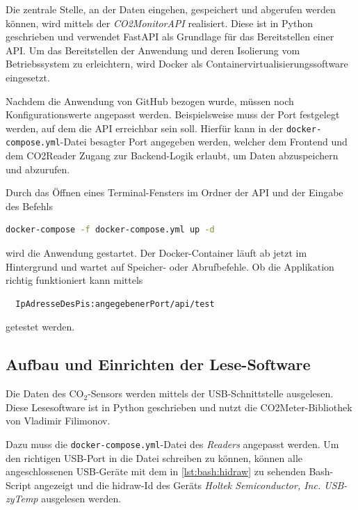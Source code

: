 \documentclass[a4paper,
    11pt,
    headings=small,
    ngerman,
    listof=totoc,
    numbers=noenddot]{scrreprt}[2021/11/13]
\begin{document}
Die zentrale Stelle, an der Daten eingehen, gespeichert und abgerufen werden können, wird mittels der \textit{CO2MonitorAPI} realisiert. Diese ist in Python geschrieben und verwendet FastAPI als Grundlage für das Bereitstellen einer API. Um das Bereitstellen der Anwendung und deren  Isolierung vom Betriebssystem zu erleichtern, wird Docker als Containervirtualisierungssoftware eingesetzt.

Nachdem die Anwendung von GitHub bezogen wurde, müssen noch Konfigurationswerte angepasst werden. Beispielsweise muss der Port festgelegt werden, auf dem die \ac{API} erreichbar sein soll. Hierfür kann in der \texttt{docker-compose.yml}-Datei besagter Port angegeben werden, welcher dem Frontend und dem CO2Reader Zugang zur Backend-Logik erlaubt, um Daten abzuspeichern und abzurufen.

Durch das Öffnen eines Terminal-Fensters im Ordner der \ac{API} und der Eingabe des Befehls

\begin{lstlisting}[language=Bash]
  docker-compose -f docker-compose.yml up -d
\end{lstlisting}

wird die Anwendung gestartet. Der Docker-Container läuft ab jetzt im Hintergrund und wartet auf Speicher- oder Abrufbefehle. Ob die Applikation richtig funktioniert kann mittels

\begin{lstlisting}
  IpAdresseDesPis:angegebenerPort/api/test
\end{lstlisting}

getestet werden.


\subsection{Aufbau und Einrichten der Lese-Software}

Die Daten des CO$_2$-Sensors werden mittels der USB-Schnittstelle ausgelesen. Diese Lesesoftware ist in Python geschrieben und nutzt die CO2Meter-Bibliothek von Vladimir Filimonov.
\autocite{github_co2meter}

Dazu muss die \texttt{docker-compose.yml}-Datei des \textit{Readers} angepasst werden. Um den richtigen USB-Port in die Datei schreiben zu können, können alle angeschlossenen USB-Geräte mit dem in \cref{lst:bash:hidraw} zu sehenden Bash-Script angezeigt und die hidraw-Id des Geräts \textit{Holtek Semiconductor, Inc. USB-zyTemp} ausgelesen werden. \autocite{get_usb_hidraw}
\end{document}
